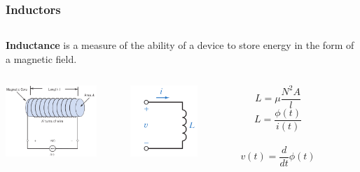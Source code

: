 \documentclass[aspectratio=169]{beamer}
\begin{document}
\begin{frame}[fragile]
\frametitle{Inductors}
\begin{columns}
\begin{column}{1\textwidth}  %
\textbf{Inductance} is a measure of the ability of a device to store energy in the form of a magnetic field.
\end{column}
\end{columns}
	
	\begin{columns}
		\begin{column}{.2\textwidth}  %
		\begin{center}
			\includegraphics[height=2.7cm]{figura3.png}
		\end{center}
		\end{column}
		\begin{column}{.22\textwidth}  %
		\begin{center}
			\includegraphics[height=2.7cm]{figura4.png}
		\end{center}
		\end{column}
		\begin{column}{.17\textwidth}  %
		\begin{center}
			\scriptsize	\begin{equation} 
					  {L=\mu \frac{N^{2}A}{l}}
					\end{equation}
			\scriptsize	\begin{equation} 
					L=\frac{\phi(t)}{i(t)}
					\end{equation}\\
		    \scriptsize	\begin{equation} 
					v(t)=\frac{d}{dt}\phi(t)
					\end{equation}			
		\end{center}
		\end{column}

		\begin{column}{.25\textwidth}  %
		\begin{center}
		


\end{center}
\end{column}
\end{columns}
\end{frame}
\end{document}
